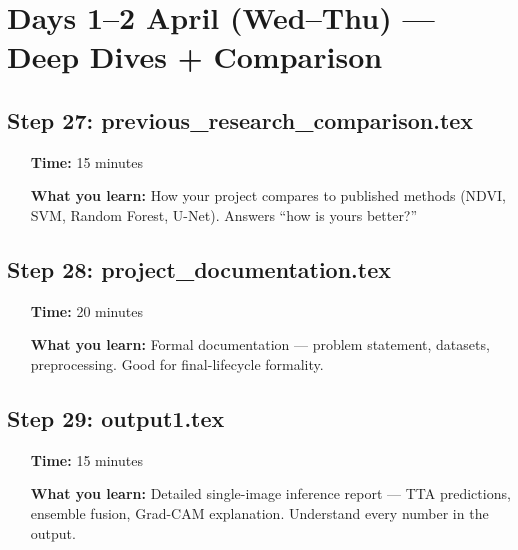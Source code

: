 \documentclass[12pt,a4paper]{article}
\begin{document}
\section{Days 1--2 April (Wed--Thu) --- Deep Dives + Comparison}

\begin{center}
\end{center}

\subsection*{Step 27: previous\_research\_comparison.tex}
\begin{itemize}[leftmargin=1.5cm]
    \item[\textbf{Time:}] 15 minutes
    \item[\textbf{What you learn:}] How your project compares to published methods (NDVI, SVM, Random Forest, U-Net). Answers ``how is yours better?''
\end{itemize}

\subsection*{Step 28: project\_documentation.tex}
\begin{itemize}[leftmargin=1.5cm]
    \item[\textbf{Time:}] 20 minutes
    \item[\textbf{What you learn:}] Formal documentation --- problem statement, datasets, preprocessing. Good for final-lifecycle formality.
\end{itemize}

\subsection*{Step 29: output1.tex}
\begin{itemize}[leftmargin=1.5cm]
    \item[\textbf{Time:}] 15 minutes
    \item[\textbf{What you learn:}] Detailed single-image inference report --- TTA predictions, ensemble fusion, Grad-CAM explanation. Understand every number in the output.
\end{itemize}
\end{document}
